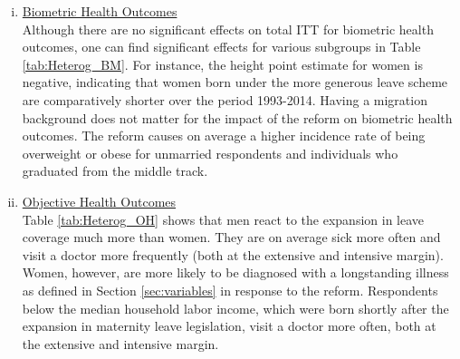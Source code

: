 \documentclass[a4paper ]{article}
\begin{document}
\begin{enumerate}[(i)]
\item \underline{Biometric Health Outcomes} \\ Although there are no significant effects on total ITT for biometric health outcomes, one can find significant effects for various subgroups in Table \ref{tab:Heterog_BM}. For instance, the height point estimate for women is negative, indicating that women born under the more generous leave scheme are comparatively shorter over the period 1993-2014. Having a migration background does not matter for the impact of the reform on biometric health outcomes. The reform causes on average a higher incidence rate of being overweight or obese for unmarried respondents and individuals who graduated from the middle track.

\item \underline{Objective Health Outcomes}\\Table \ref{tab:Heterog_OH} shows that men react to the expansion in leave coverage much more than women. They are on average sick more often and visit a doctor more frequently (both at the extensive and intensive margin). Women, however, are more likely to be diagnosed with a longstanding illness as defined in Section \ref{sec:variables} in response to the reform. Respondents below the median household labor income, which were born shortly after the expansion in maternity leave legislation, visit a doctor more often, both at the extensive and intensive margin. %


\end{enumerate}
\end{document}
